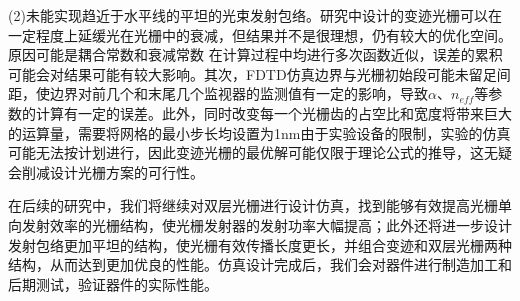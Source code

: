 \documentclass[UTF8,a4paper,12pt]{ctexart}
\numberwithin{equation}{section}
\begin{document}
(2)未能实现趋近于水平线的平坦的光束发射包络。研究中设计的变迹光栅可以在一定程度上延缓光在光栅中的衰减，但结果并不是很理想，仍有较大的优化空间。原因可能是耦合常数和衰减常数
在计算过程中均进行多次函数近似，误差的累积可能会对结果可能有较大影响。其次，FDTD仿真边界与光栅初始段可能未留足间距，使边界对前几个和末尾几个监视器的监测值有一定的影响，导致$\alpha$、$n_{eff}$等参数的计算有一定的误差。此外，同时改变每一个光栅齿的占空比和宽度将带来巨大的运算量，需要将网格的最小步长均设置为1nm由于实验设备的限制，实验的仿真可能无法按计划进行，因此变迹光栅的最优解可能仅限于理论公式的推导，这无疑会削减设计光栅方案的可行性。

在后续的研究中，我们将继续对双层光栅进行设计仿真，找到能够有效提高光栅单向发射效率的光栅结构，使光栅发射器的发射功率大幅提高；此外还将进一步设计发射包络更加平坦的结构，使光栅有效传播长度更长，并组合变迹和双层光栅两种结构，从而达到更加优良的性能。仿真设计完成后，我们会对器件进行制造加工和后期测试，验证器件的实际性能。

\newpage
{}


%      

%        
\end{document}

